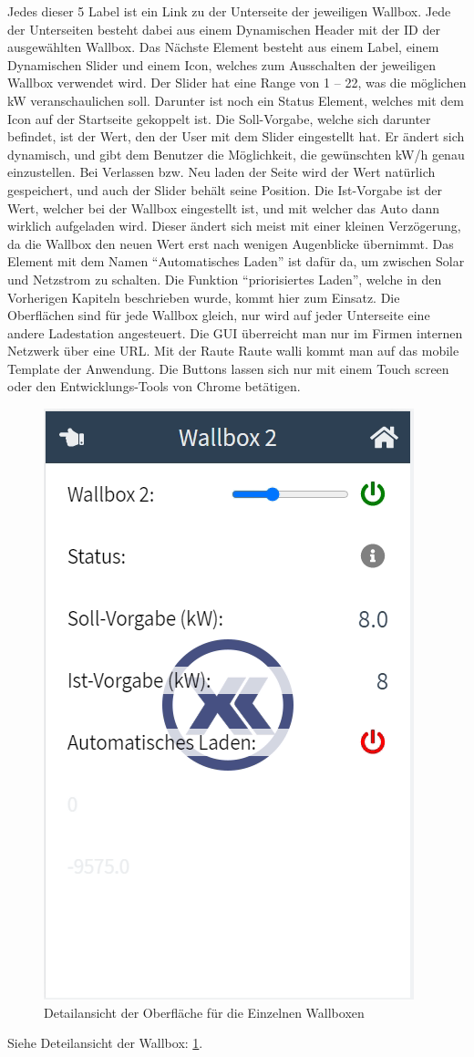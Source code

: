 Jedes dieser 5 Label ist ein Link zu der Unterseite der jeweiligen Wallbox. Jede der Unterseiten besteht dabei aus einem Dynamischen Header mit der ID der ausgewählten Wallbox. Das Nächste Element besteht aus einem Label, einem Dynamischen Slider und einem Icon, welches zum Ausschalten der jeweiligen Wallbox verwendet wird. Der Slider hat eine Range von 1 – 22, was die möglichen kW veranschaulichen soll. Darunter ist noch ein Status Element, welches mit dem Icon auf der Startseite gekoppelt ist. Die Soll-Vorgabe, welche sich darunter befindet, ist der Wert, den der User mit dem Slider eingestellt hat. Er ändert sich dynamisch, und gibt dem Benutzer die Möglichkeit, die gewünschten kW/h genau einzustellen. Bei Verlassen bzw. Neu laden der Seite wird der Wert natürlich gespeichert, und auch der Slider behält seine Position. Die Ist-Vorgabe ist der Wert, welcher bei der Wallbox eingestellt ist, und mit welcher das Auto dann wirklich aufgeladen wird. Dieser ändert sich meist mit einer kleinen Verzögerung, da die Wallbox den neuen Wert erst nach wenigen Augenblicke übernimmt. Das Element mit dem Namen “Automatisches Laden” ist dafür da, um zwischen Solar und Netzstrom zu schalten. Die Funktion “priorisiertes Laden”, welche in den Vorherigen Kapiteln beschrieben wurde, kommt hier zum Einsatz. Die Oberflächen sind für jede Wallbox gleich, nur wird auf jeder Unterseite eine andere Ladestation angesteuert. Die GUI überreicht man nur im Firmen internen Netzwerk über eine URL. Mit der Raute Raute walli kommt man auf das mobile Template der Anwendung. Die Buttons lassen sich nur mit einem Touch screen oder den Entwicklungs-Tools von Chrome betätigen.  


\begin{figure}[h t]
  \centering
  \includegraphics[scale=0.5]{pics/DetailansichtWallbox2.png}
  \caption{Detailansicht der Oberfläche für die Einzelnen Wallboxen }
  \label{fig:impl:HMIWallboxDetail}
\end{figure}

Siehe Deteilansicht der Wallbox: \ref{fig:impl:HMIWallboxDetail}.

